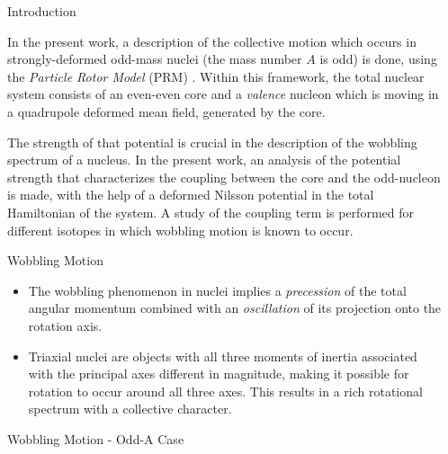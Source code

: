 \documentclass[final]{beamer}
\newlength{\sepwidth}
\newlength{\colwidth}
\newcommand{\separatorcolumn}{\begin{column}{\sepwidth}\end{column}}
\begin{document}
\begin{frame}[t]
\begin{columns}[t]
\separatorcolumn

\begin{column}{\colwidth}

  \begin{block}{Introduction}

In the present work, a description of the collective motion which occurs in strongly-deformed odd-mass nuclei (the mass number $A$ is odd) is done, using the \emph{Particle Rotor Model} (PRM) \cite{bohr1998nuclear}. Within this framework, the total nuclear system consists of an even-even core and a \emph{valence} nucleon which is moving in a quadrupole deformed mean field, generated by the core.

The strength of that potential is crucial in the description of the wobbling spectrum of a nucleus. In the present work, an analysis of the potential strength that characterizes the coupling between the core and the odd-nucleon is made, with the help of a deformed Nilsson potential in the total Hamiltonian of the system. A study of the coupling term is performed for different isotopes in which wobbling motion is known to occur.

  \end{block}

  \begin{block}{Wobbling Motion}
  
\begin{itemize}
    \item The wobbling phenomenon in nuclei implies a \emph{precession} of the total angular momentum combined with an \emph{oscillation} of its projection onto the rotation axis.
    \item Triaxial nuclei are objects with all three moments of inertia associated with the principal axes different in magnitude, making it possible for rotation to occur around all three axes. This results in a rich rotational spectrum with a collective character.
\end{itemize}

  \end{block}
  
    \begin{block}{Wobbling Motion - Odd-A Case}
  
  \end{block}

\end{column}


\end{columns}
\end{frame}
\end{document}
